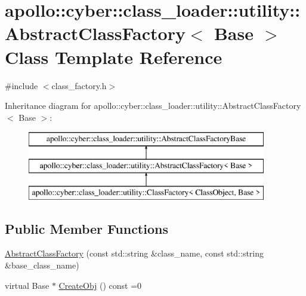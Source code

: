 \hypertarget{classapollo_1_1cyber_1_1class__loader_1_1utility_1_1AbstractClassFactory}{\section{apollo\-:\-:cyber\-:\-:class\-\_\-loader\-:\-:utility\-:\-:Abstract\-Class\-Factory$<$ Base $>$ Class Template Reference}
\label{classapollo_1_1cyber_1_1class__loader_1_1utility_1_1AbstractClassFactory}
}


{\ttfamily \#include $<$class\-\_\-factory.\-h$>$}

Inheritance diagram for apollo\-:\-:cyber\-:\-:class\-\_\-loader\-:\-:utility\-:\-:Abstract\-Class\-Factory$<$ Base $>$\-:\begin{figure}[H]
\begin{center}
\leavevmode
\includegraphics[height=3.000000cm]{classapollo_1_1cyber_1_1class__loader_1_1utility_1_1AbstractClassFactory}
\end{center}
\end{figure}
\subsection*{Public Member Functions}
\begin{DoxyCompactItemize}
\item 
\hyperlink{classapollo_1_1cyber_1_1class__loader_1_1utility_1_1AbstractClassFactory_ab0013ed740cae566717e534e16345ed0}{Abstract\-Class\-Factory} (const std\-::string \&class\-\_\-name, const std\-::string \&base\-\_\-class\-\_\-name)
\item 
virtual Base $\ast$ \hyperlink{classapollo_1_1cyber_1_1class__loader_1_1utility_1_1AbstractClassFactory_ae603a03f06c93b5f0475e63a0f2a9402}{Create\-Obj} () const =0
\end{DoxyCompactItemize}

